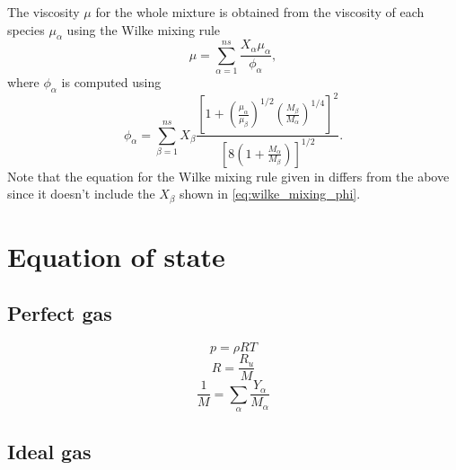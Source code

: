 \documentclass[oneside,a4paper,11pt]{report}
\begin{document}
The viscosity $\mu$ for the whole mixture is obtained from the viscosity of each species $\mu_\alpha$ using the Wilke mixing rule \cite{wilke1950}
\begin{equation}
\mu = \sum_{\alpha = 1}^{ns} \frac{X_\alpha \mu_\alpha}{\phi_\alpha},
\end{equation}
where $\phi_\alpha$ is computed using
\begin{equation}
\label{eq:wilke_mixing_phi}
    \phi_\alpha = \sum_{\beta = 1}^{ns} X_\beta \frac{ \left [ 1 + \left ( \frac{\mu_\alpha}{\mu_\beta} \right )^{1/2} \left ( \frac{M_\beta}{M_\alpha} \right)^{1/4} \right]^2}{ \left [ 8 \left ( 1 + \frac{M_\alpha}{M_\beta} \right ) \right ]^{1/2} }.
\end{equation}
Note that the equation for the Wilke mixing rule given in \cite{palmer2003} differs from the above since it doesn't include the $X_\beta$ shown in \cref{eq:wilke_mixing_phi}. 

\section{Equation of state}
\subsection{Perfect gas}
\begin{equation}
p = \rho R T 
\end{equation}
\begin{equation}
R = \frac{R_u}{M}
\end{equation}
\begin{equation}
\frac{1}{M} = \sum_\alpha \frac{Y_\alpha}{M_\alpha}
\end{equation}

\subsection{Ideal gas}

\end{document}
